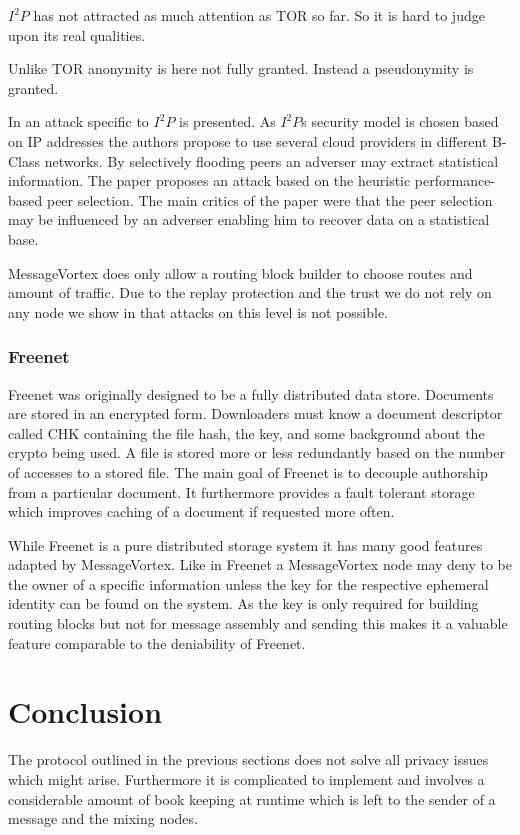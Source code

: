 \documentclass[9pt,journal,compsoc]{IEEEtran}
\begin{document}
$I^2P$ has not attracted as much attention as TOR so far. So it is hard to judge upon its real qualities. 

Unlike TOR anonymity is here not fully granted. Instead a pseudonymity is granted. 

In \cite{pets2011-i2p} an attack specific to $I^2P$ is presented. As $I^2P$s security model is chosen based on IP addresses the authors propose to use several cloud providers in different B-Class networks. By selectively flooding peers an adverser may extract statistical information. The paper proposes an attack based on the heuristic performance-based peer selection. The main critics of the paper were that the peer selection may be influenced by an adverser enabling him to recover data on a statistical base.

MessageVortex does only allow a routing block builder to choose routes and amount of traffic. Due to the replay protection and the trust we do not rely on any node we show in \cite{messageVortex} that attacks on this level is not possible.

\subsubsection{Freenet}
Freenet was originally designed to be a fully distributed data store\cite{freenet}. Documents are stored in an encrypted form. Downloaders must know a document descriptor called CHK containing the file hash, the key, and some background about the crypto being used. A file is stored more or less redundantly based on the number of accesses to a stored file. The main goal of Freenet is to decouple  authorship from a particular document. It furthermore provides a fault tolerant storage which improves caching of a document if requested more often.

While Freenet is a pure distributed storage system it has many good features adapted by MessageVortex. Like in Freenet a MessageVortex node may deny to be the owner of a specific information unless the key for the respective ephemeral identity can be found on the system. As the key is only required for building routing blocks but not for message assembly and sending this makes it a valuable feature comparable to the deniability of Freenet.

\section{Conclusion}
The protocol outlined in the previous sections does not solve all privacy issues which might arise. Furthermore it is complicated to implement and involves a considerable amount of book keeping at runtime which is left to the sender of a message and the mixing nodes. 
\end{document}
